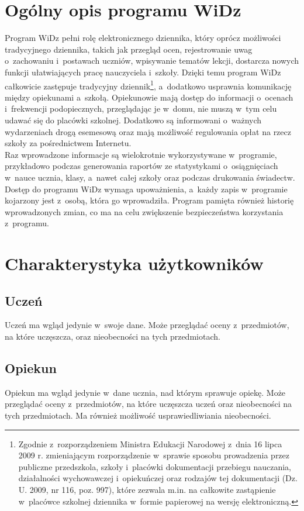 \documentclass[12pt,leqno,twoside]{mwart}
\begin{document}
\section{Ogólny opis programu WiDz}
\noindent Program WiDz pełni rolę elektronicznego dziennika, który oprócz możliwości tradycyjnego dziennika, takich jak przegląd ocen, rejestrowanie uwag o~zachowaniu i~postawach uczniów, wpisywanie tematów lekcji, dostarcza nowych funkcji ułatwiających pracę nauczyciela i~szkoły. Dzięki temu program WiDz całkowicie zastępuje tradycyjny dziennik\footnote{Zgodnie z~rozporządzeniem Ministra Edukacji Narodowej z~dnia 16 lipca 2009 r. zmieniającym rozporządzenie w~sprawie sposobu prowadzenia przez publiczne przedszkola, szkoły i~placówki dokumentacji przebiegu nauczania, działalności wychowawczej i~opiekuńczej oraz rodzajów tej dokumentacji (Dz. U. 2009, nr 116, poz. 997), które zezwala m.in. na całkowite zastąpienie w~placówce szkolnej dziennika w~formie papierowej na wersję elektroniczną.}, a~dodatkowo usprawnia komunikację między opiekunami a~szkołą. Opiekunowie mają dostęp do informacji o~ocenach i~frekwencji podopiecznych, przeglądając je w~domu, nie muszą w~tym celu udawać się do placówki szkolnej. Dodatkowo są informowani o~ważnych wydarzeniach drogą esemesową oraz mają możliwość regulowania opłat na rzecz szkoły za pośrednictwem Internetu.\\
\indent Raz wprowadzone informacje są wielokrotnie wykorzystywane w~programie, przykładowo podczas generowania raportów ze statystykami o~osiągnięciach w~nauce ucznia, klasy, a~nawet całej szkoły oraz podczas drukowania świadectw.\\
\indent Dostęp do programu WiDz wymaga upoważnienia, a~każdy zapis w~programie  kojarzony jest z~osobą, która go wprowadziła. Program pamięta również historię wprowadzonych zmian, co ma na celu zwiększenie bezpieczeństwa korzystania z~programu.

\section{Charakterystyka użytkowników}\label{CHARAKTER_UZYTK}
\subsection{Uczeń}
\noindent Uczeń ma wgląd jedynie w~swoje dane. Może przeglądać oceny z~przedmiotów, na które uczęszcza, oraz nieobecności na tych przedmiotach.

\subsection{Opiekun}
\noindent Opiekun ma wgląd jedynie w~dane ucznia, nad którym sprawuje opiekę. Może przeglądać oceny z~przedmiotów, na które uczęszcza uczeń oraz nieobecności na tych przedmiotach. Ma również możliwość usprawiedliwiania nieobecności.
\end{document}

